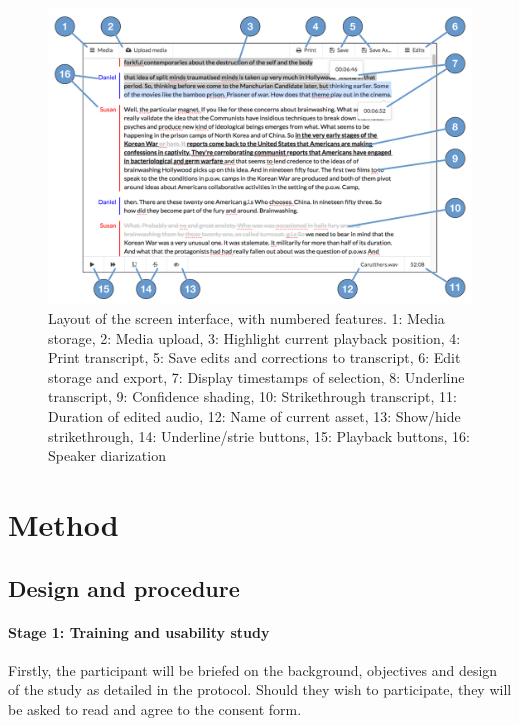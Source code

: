 \begin{figure}[ht]
  \centering
  \includegraphics[width=\columnwidth]{figs/discourse-interface-labelled.pdf}
  \caption{Layout of the screen interface, with numbered features.
  1: Media storage,
  2: Media upload,
  3: Highlight current playback position,
  4: Print transcript,
  5: Save edits and corrections to transcript,
  6: Edit storage and export,
  7: Display timestamps of selection,
  8: Underline transcript,
  9: Confidence shading,
  10: Strikethrough transcript,
  11: Duration of edited audio,
  12: Name of current asset,
  13: Show/hide strikethrough,
  14: Underline/strie buttons,
  15: Playback buttons,
  16: Speaker diarization}
  \label{fig:dialogger-interface}
\end{figure}

\section{Method}\label{sec:method}

\subsection{Design and procedure}


\paragraph{Stage 1: Training and usability study}
Firstly, the participant will be briefed on the background, objectives and design of the study as detailed in the
protocol.  Should they wish to participate, they will be asked to read and agree to the consent form.

